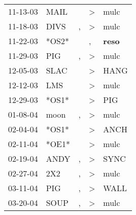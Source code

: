 \begin{supertabular}{p{0.07\textwidth}p{0.06\textwidth}p{0.02\textwidth}p{0.02\textwidth}p{0.06\textwidth}}
          11-13-03\textsuperscript{} &           MAIL\textsuperscript{} &                  &     \textgreater &           mulc\textsuperscript{} \\
          11-18-03\textsuperscript{} &           DIVS\textsuperscript{} &                , &     \textgreater &           mulc\textsuperscript{} \\
          11-22-03\textsuperscript{} &                            *OS2* &                  &                , &  \textbf{reso\textsuperscript{}} \\
          11-29-03\textsuperscript{} &            PIG\textsuperscript{} &                , &     \textgreater &           mulc\textsuperscript{} \\
          12-05-03\textsuperscript{} &           SLAC\textsuperscript{} &                  &     \textgreater &           HANG\textsuperscript{} \\
          12-12-03\textsuperscript{} &            LMS\textsuperscript{} &                  &     \textgreater &           mulc\textsuperscript{} \\
          12-29-03\textsuperscript{} &                            *OS1* &                  &     \textgreater &            PIG\textsuperscript{} \\
          01-08-04\textsuperscript{} &           moon\textsuperscript{} &                , &     \textgreater &           mulc\textsuperscript{} \\
          02-04-04\textsuperscript{} &                            *OS1* &                  &     \textgreater &           ANCH\textsuperscript{} \\
          02-11-04\textsuperscript{} &                            *OE1* &                  &     \textgreater &           mulc\textsuperscript{} \\
          02-19-04\textsuperscript{} &           ANDY\textsuperscript{} &                , &     \textgreater &           SYNC\textsuperscript{} \\
          02-27-04\textsuperscript{} &            2X2\textsuperscript{} &                , &     \textgreater &           mulc\textsuperscript{} \\
          03-11-04\textsuperscript{} &            PIG\textsuperscript{} &                , &     \textgreater &           WALL\textsuperscript{} \\
          03-20-04\textsuperscript{} &           SOUP\textsuperscript{} &                , &     \textgreater &           mulc\textsuperscript{} \\

\end{supertabular}
